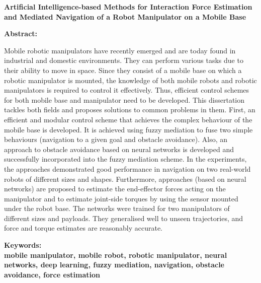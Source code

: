 

\newpage
\setlength{\parindent}{0in}
{\fontsize{14}{18}\bf {Artificial Intelligence-based Methods for Interaction Force Estimation and Mediated Navigation of a Robot Manipulator on a Mobile Base}}

\vskip 15mm
\textbf{Abstract:\\}	
	
\textnormal{Mobile robotic manipulators have recently emerged and are today found in industrial and domestic environments. They can perform various tasks due to their ability to move in space. Since they consist of a mobile base on which a robotic manipulator is mounted, the knowledge of both mobile robots and robotic manipulators is required to control it effectively. Thus, efficient control schemes for both mobile base and manipulator need to be developed. This dissertation tackles both fields and proposes solutions to common problems in them. First, an efficient and modular control scheme that achieves the complex behaviour of the mobile base is developed. It is achieved using fuzzy mediation to fuse two simple behaviours (navigation to a given goal and obstacle avoidance). Also, an approach to obstacle avoidance based on neural networks is developed and successfully incorporated into the fuzzy mediation scheme. In the experiments, the approaches demonstrated good performance in navigation on two real-world robots of different sizes and shapes. Furthermore, approaches (based on neural networks) are proposed to estimate the end-effector forces acting on the manipulator and to estimate joint-side torques by using the sensor mounted under the robot base. The networks were trained for two manipulators of different sizes and payloads. They generalised well to unseen trajectories, and force and torque estimates are reasonably accurate.}
	
\vskip 15mm
\bf{Keywords:\\}
\textnormal{mobile manipulator, mobile robot, robotic manipulator, neural networks, deep learning, fuzzy mediation, navigation, obstacle avoidance, force estimation}
